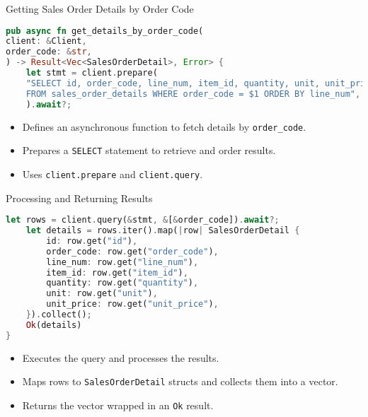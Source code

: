 \documentclass[aspectratio=169, table]{beamer}
\begin{document}
\begin{frame}[fragile]{Getting Sales Order Details by Order Code}
\begin{lstlisting}[language=Rust]
pub async fn get_details_by_order_code(
client: &Client,
order_code: &str,
) -> Result<Vec<SalesOrderDetail>, Error> {
	let stmt = client.prepare(
	"SELECT id, order_code, line_num, item_id, quantity, unit, unit_price
	FROM sales_order_details WHERE order_code = $1 ORDER BY line_num",
	).await?;
\end{lstlisting}
\begin{itemize}
	\item Defines an asynchronous function to fetch details by \texttt{order\_code}.
	\item Prepares a \texttt{SELECT} statement to retrieve and order results.
	\item Uses \texttt{client.prepare} and \texttt{client.query}.
\end{itemize}
\end{frame}

\begin{frame}[fragile]{Processing and Returning Results}
	\vspace{15pt}
\begin{lstlisting}[language=Rust]
	let rows = client.query(&stmt, &[&order_code]).await?;
	let details = rows.iter().map(|row| SalesOrderDetail {
		id: row.get("id"),
		order_code: row.get("order_code"),
		line_num: row.get("line_num"),
		item_id: row.get("item_id"),
		quantity: row.get("quantity"),
		unit: row.get("unit"),
		unit_price: row.get("unit_price"),
	}).collect();
	Ok(details)
}
\end{lstlisting}
\begin{itemize}
\item Executes the query and processes the results.
\item Maps rows to \texttt{SalesOrderDetail} structs and collects them into a vector.
\item Returns the vector wrapped in an \texttt{Ok} result.
\end{itemize}
\end{frame}
\end{document}
